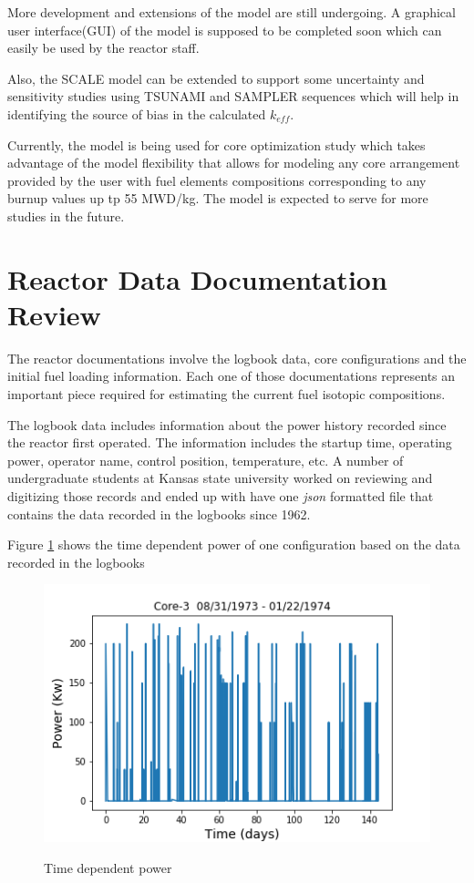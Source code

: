 \documentclass[review]{elsarticle}
\begin{document}
 More development and extensions of the model are still undergoing. A graphical user interface(GUI) of the model is supposed to be completed soon which can easily be used by the reactor staff.
 
 Also, the SCALE model can be extended to support some uncertainty and sensitivity studies using TSUNAMI and SAMPLER sequences which will help in identifying the source of bias in the calculated $k_{eff}$.
 
 Currently, the model is being used for core optimization study which takes advantage of the model flexibility that allows for modeling any core arrangement provided by the user with fuel elements compositions corresponding to any burnup values up tp 55 MWD/kg. The model is expected to serve for more studies in the future.
 
\section{Reactor Data Documentation Review}
The reactor documentations involve the logbook data, core configurations and the initial fuel loading information.
Each one of those documentations represents an important piece required for estimating the current fuel isotopic compositions.

The logbook data includes information about the power history recorded since the reactor first operated. The information includes the startup time, operating power, operator name, control position, temperature, etc.
A number of undergraduate students at Kansas state university worked on reviewing and digitizing those records and ended up with have one \emph{json} formatted file that contains the data recorded in the logbooks since 1962. 

Figure \ref{fig:core3_power} shows the time dependent power of one configuration based on the data recorded in the logbooks

\begin{figure}[h]
	\centering
	\includegraphics[scale=0.8]{core3.png}\\
	\caption{Time dependent power}
	\label{fig:core3_power}
\end{figure}
\end{document}
